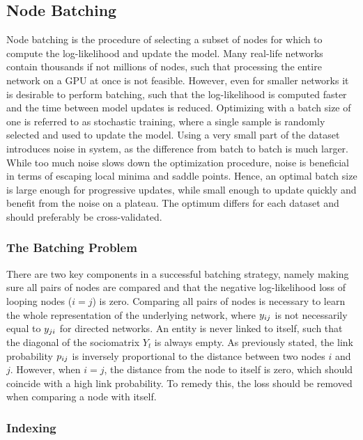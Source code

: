 \subsection{Node Batching}

    Node batching is the procedure of selecting a subset of nodes for which to compute the log-likelihood and update the model. Many real-life networks contain thousands if not millions of nodes, such that processing the entire network on a GPU at once is not feasible. However, even for smaller networks it is desirable to perform batching, such that the log-likelihood is computed faster and the time between model updates is reduced. Optimizing with a batch size of one is referred to as stochastic training, where a single sample is randomly selected and used to update the model. Using a very small part of the dataset introduces noise in system, as the difference from batch to batch is much larger. While too much noise slows down the optimization procedure, noise is beneficial in terms of escaping local minima and saddle points. Hence, an optimal batch size is large enough for progressive updates, while small enough to update quickly and benefit from the noise on a plateau. The optimum differs for each dataset and should preferably be cross-validated.
    
    \subsubsection{The Batching Problem}
    
        There are two key components in a successful batching strategy, namely making sure all pairs of nodes are compared and that the negative log-likelihood loss of looping nodes ($i=j$) is zero. 
        Comparing all pairs of nodes is necessary to learn the whole representation of the underlying network, where $\sub(y)$ is not necessarily equal to $\sub(y)(ji)$ for directed networks. 
        An entity is never linked to itself, such that the diagonal of the sociomatrix $Y_t$ is always empty. As previously stated, the link probability $\sub(p)$ is inversely proportional to the distance between two nodes $i$ and $j$. However, when $i=j$, the distance from the node to itself is zero, which should coincide with a high link probability. To remedy this, the loss should be removed when comparing a node with itself.
        
    \subsubsection{Indexing}
    
